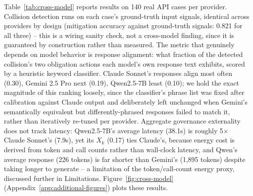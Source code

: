 \documentclass[letterpaper]{article} %
\begin{document}
Table~\ref{tab:cross-model} reports results on 140 real API cases per provider. Collision detection runs on each case's ground-truth input signals, identical across providers by design (mitigation accuracy against ground-truth signals: 0.821 for all three) -- this is a wiring sanity check, not a cross-model finding, since it is guaranteed by construction rather than measured. The metric that genuinely depends on model behavior is response alignment: what fraction of the detected collision's two obligation actions each model's own response text exhibits, scored by a heuristic keyword classifier. Claude Sonnet's responses align most often (0.30), Gemini 2.5 Pro next (0.19), Qwen2.5-7B least (0.10); we hold the exact magnitude of this ranking loosely, since the classifier's phrase list was fixed after calibration against Claude output and deliberately left unchanged when Gemini's semantically equivalent but differently-phrased responses failed to match it, rather than iteratively re-tuned per provider. Aggregate governance externality does not track latency: Qwen2.5-7B's average latency (38.1s) is roughly 5$\times$ Claude Sonnet's (7.9s), yet its $X_k$ (0.17) ties Claude's, because energy cost is derived from token and call counts rather than wall-clock latency, and Qwen's average response (226 tokens) is far shorter than Gemini's (1,895 tokens) despite taking longer to generate -- a limitation of the token/call-count energy proxy, discussed further in Limitations. Figure~\ref{fig:cross-model} (Appendix~\ref{app:additional-figures}) plots these results.
\end{document}
